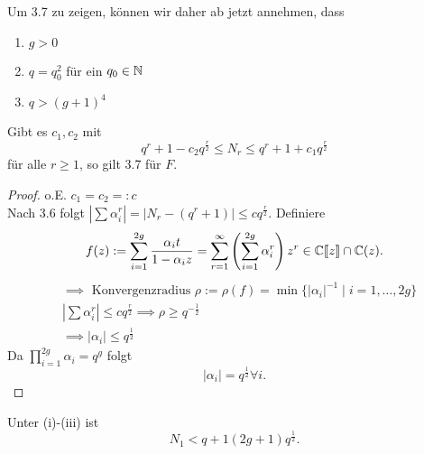 \begin{bemerkungnr}
    Um 3.7 zu zeigen, können wir daher ab jetzt annehmen, dass
    \begin{enumerate}[label=(\roman*)]
        \item $g > 0$
        \item $q = q_0^2$ für ein $q_0 \in \mathbb{N}$
        \item $q > (g+1)^4$
    \end{enumerate}
\end{bemerkungnr}

\begin{satz}
    Gibt es $c_1, c_2$ mit
    $$ q^r + 1 - c_2 q^\frac{r}{2} \leq N_r \leq q^r + 1 + c_1 q^\frac{r}{2}$$
    für alle $r \geq 1$, so gilt 3.7 für $F$.
\end{satz}
\begin{proof}
    o.E. $c_1 = c_2 =: c$\\
    Nach 3.6 folgt $\left|\sum \alpha_i^r \right| = \left| N_r - (q^r + 1)\right| \leq c q^\frac{r}{2}$. Definiere
    $$ f(z) := \sum_{i=1}^{2g} \frac{\alpha_it}{1-\alpha_iz} = \sum_{r=1}^\infty\left(\sum_{i=1}^{2g} \alpha_i^r\right)z^r \in \mathbb{C}\llbracket z\rrbracket \cap \mathbb{C}(z).$$
    \begin{align*}
        &\implies \text{ Konvergenzradius } \rho := \rho(f) = \min\{|\alpha_i|^{-1} \mid i = 1,\ldots,2g\}\\
        & \left|\sum \alpha_i^r\right| \leq c q^\frac{r}{2} \implies \rho \geq q^{-\frac{1}{2}}\\
        & \implies |\alpha_i| \leq q^\frac{1}{2}
    \end{align*}
    Da $\prod\limits_{i=1}^{2g}\alpha_i = q^g$ folgt 
    $$ |\alpha_i| = q^\frac{1}{2} \forall i. $$
\end{proof}

\begin{satz}
    Unter (i)-(iii) ist 
    $$ N_1 < q +1 (2g +1)q^\frac{1}{2}. $$
\end{satz}
